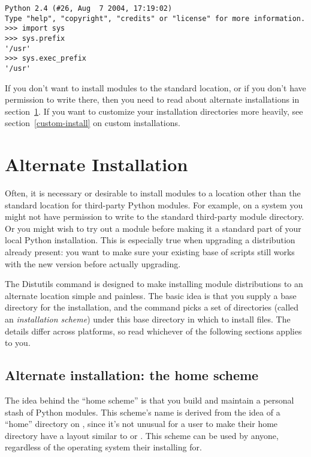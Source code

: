 \documentclass{howto}
\begin{document}
\begin{verbatim}
Python 2.4 (#26, Aug  7 2004, 17:19:02) 
Type "help", "copyright", "credits" or "license" for more information.
>>> import sys
>>> sys.prefix
'/usr'
>>> sys.exec_prefix
'/usr'
\end{verbatim}

If you don't want to install modules to the standard location, or if you
don't have permission to write there, then you need to read about
alternate installations in section~\ref{alt-install}.  If you want to
customize your installation directories more heavily, see
section~\ref{custom-install} on custom installations.


\section{Alternate Installation}
\label{alt-install}

Often, it is necessary or desirable to install modules to a location
other than the standard location for third-party Python modules.  For
example, on a \UNIX{} system you might not have permission to write to the
standard third-party module directory.  Or you might wish to try out a
module before making it a standard part of your local Python
installation.  This is especially true when upgrading a distribution
already present: you want to make sure your existing base of scripts
still works with the new version before actually upgrading.

The Distutils  command is designed to make installing
module distributions to an alternate location simple and painless.  The
basic idea is that you supply a base directory for the installation, and
the  command picks a set of directories (called an
\emph{installation scheme}) under this base directory in which to
install files.  The details differ across platforms, so read whichever
of the following sections applies to you.


\subsection{Alternate installation: the home scheme}
\label{alt-install-prefix}

The idea behind the ``home scheme'' is that you build and maintain a
personal stash of Python modules.  This scheme's name is derived from
the idea of a ``home'' directory on \UNIX, since it's not unusual for
a \UNIX{} user to make their home directory have a layout similar to
 or .  This scheme can be used by
anyone, regardless of the operating system their installing for.
\end{document}
